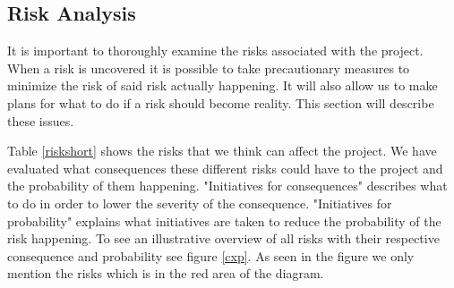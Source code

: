 \subsection{Risk Analysis}
\label{risk}
It is important to thoroughly examine the risks associated with the project. When a risk is uncovered it is possible to take precautionary measures to minimize the risk of said risk actually happening. It will also allow us to make plans for what to do if a risk should become reality. This section will describe these issues.

Table \ref{riskshort} shows the risks that we think can affect the project. 
We have evaluated what consequences these different risks could have to the project and the probability of them happening.
"Initiatives for consequences" describes what to do in order to lower the severity of the consequence.
"Initiatives for probability" explains what initiatives are taken to reduce the probability of the risk happening. 
To see an illustrative overview of all risks with their respective consequence and probability see figure \ref{cxp}. 
As seen in the figure we only mention the risks which is in the red area of the diagram.

